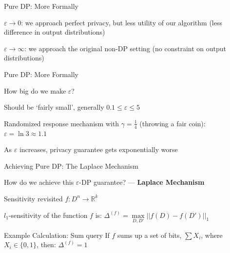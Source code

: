\documentclass[12pt,aspectratio=169]{beamer}
\begin{document}
\begin{frame}{Pure DP: More Formally}

$\varepsilon \rightarrow 0$: we approach perfect privacy, but less utility of our algorithm (less difference in output distributions)

$\varepsilon \rightarrow \infty$: we approach the original non-DP setting (no constraint on output distributions)

\end{frame}


\begin{frame}{Pure DP: More Formally}

How big do we make $\varepsilon$?

Should be `fairly small', generally $0.1 \leq \varepsilon \leq 5$

Randomized response mechanism with $\gamma = \frac{1}{4}$ (throwing a fair coin): $\varepsilon = \ln{3} \approx 1.1$

As $\varepsilon$ increases, privacy guarantee gets exponentially worse

\end{frame}

\begin{frame}{Achieving Pure DP: The Laplace Mechanism}

How do we achieve this $\varepsilon$-DP guarantee? --- \textbf{Laplace Mechanism}

\vspace{3mm}

\begin{block}{Sensitivity revisited}
$f: D^n \rightarrow \mathbb{R}^k$

$l_1$-sensitivity of the function $f$ is: $\Delta^{(f)} = \underset{D, D'}{\max} ||f(D) - f(D')||_1$
\end{block}

\begin{block}{Example Calculation: Sum query}
If $f$ sums up a set of bits, $\sum X_i$, where $X_i \in \{0,1\}$, then: $\Delta^{(f)} = 1$
\end{block}

\end{frame}
\end{document}

